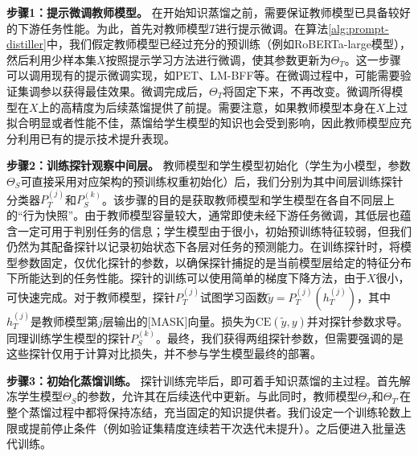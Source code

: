 \documentclass[../main.tex]{subfiles}
\begin{document}
\textbf{步骤1：提示微调教师模型。} 在开始知识蒸馏之前，需要保证教师模型已具备较好的下游任务性能。为此，首先对教师模型$T$进行提示微调。在算法\ref{alg:prompt-distiller}中，我们假定教师模型已经过充分的预训练（例如RoBERTa-large模型），然后利用少样本集$X$按照提示学习方法进行微调，使其参数更新为$\Theta_T$。这一步骤可以调用现有的提示微调实现，如PET、LM-BFF等。在微调过程中，可能需要验证集调参以获得最佳效果。微调完成后，$\Theta_T$将固定下来，不再改变。微调所得模型在$X$上的高精度为后续蒸馏提供了前提。需要注意，如果教师模型本身在$X$上过拟合明显或者性能不佳，蒸馏给学生模型的知识也会受到影响，因此教师模型应充分利用已有的提示技术提升表现。

\textbf{步骤2：训练探针观察中间层。} 教师模型和学生模型初始化（学生为小模型，参数$\Theta_S$可直接采用对应架构的预训练权重初始化）后，我们分别为其中间层训练探针分类器$P_T^{(j)}$和$P_S^{(k)}$。该步骤的目的是获取教师模型和学生模型在各自不同层上的“行为快照”。由于教师模型容量较大，通常即使未经下游任务微调，其低层也蕴含一定可用于判别任务的信息；学生模型由于很小，初始预训练特征较弱，但我们仍然为其配备探针以记录初始状态下各层对任务的预测能力。在训练探针时，将模型参数固定，仅优化探针的参数，以确保探针捕捉的是当前模型层给定的特征分布下所能达到的任务性能。探针的训练可以使用简单的梯度下降方法，由于$X$很小，可快速完成。对于教师模型，探针$P_T^{(j)}$试图学习函数$\tilde{y}=P_T^{(j)}(h_T^{(j)})$，其中$h_T^{(j)}$是教师模型第$j$层输出的[MASK]向量。损失为$\text{CE}(\tilde{y}, y)$并对探针参数求导。同理训练学生模型的探针$P_S^{(k)}$。最终，我们获得两组探针参数，但需要强调的是这些探针仅用于计算对比损失，并不参与学生模型最终的部署。

\textbf{步骤3：初始化蒸馏训练。} 探针训练完毕后，即可着手知识蒸馏的主过程。首先解冻学生模型$\Theta_S$的参数，允许其在后续迭代中更新。与此同时，教师模型$\Theta_T$和$\Theta_{T'}$在整个蒸馏过程中都将保持冻结，充当固定的知识提供者。我们设定一个训练轮数上限或提前停止条件（例如验证集精度连续若干次迭代未提升）。之后便进入批量迭代训练。
\end{document}

